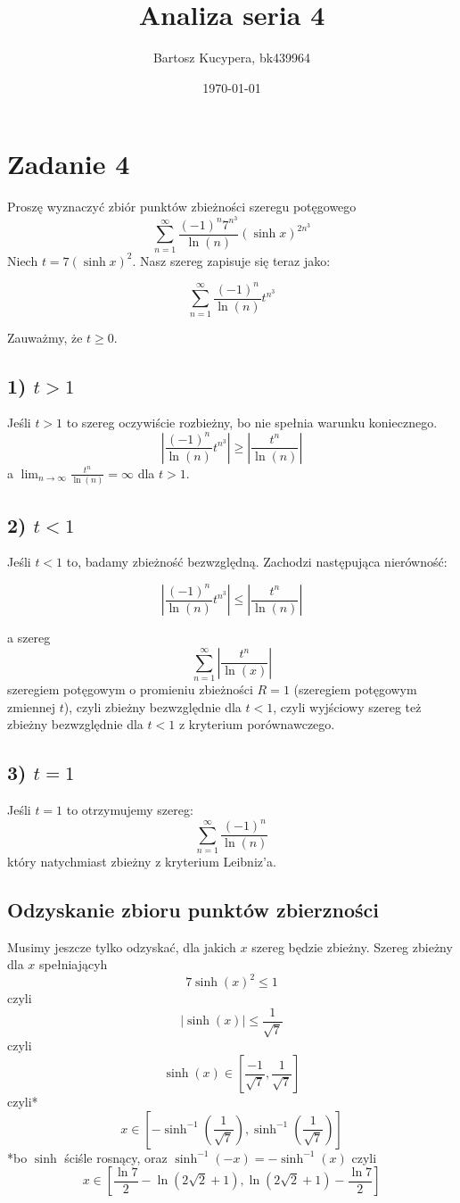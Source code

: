 \documentclass{article}
\title{Analiza seria 4}
\author{Bartosz Kucypera, bk439964}
\date{\today}
\begin{document}
\maketitle

\section*{Zadanie 4}
Proszę wyznaczyć zbiór punktów zbieżności szeregu potęgowego
$$\sum_{n=1}^{\infty} \frac{(-1)^n7^{n^3}}{\ln(n)}(\sinh x)^{2n^3}$$
Niech $t = 7(\sinh x)^2$. Nasz szereg zapisuje się teraz jako:

$$ \sum_{n=1}^{\infty}\frac{(-1)^n}{\ln(n)} t^{n^3}$$

Zauważmy, że $t \ge 0$.\newline 
\subsection*{1) $t > 1$}
Jeśli $t>1$ to szereg oczywiście rozbieżny, bo nie spełnia warunku koniecznego.
$$ \left| \frac{(-1)^n}{\ln(n)}t^{n^3} \right| \ge \left| \frac{t^n}{\ln(n)} \right| $$
a $\displaystyle \lim_{n \to \infty} \frac{t^n}{\ln(n)} = \infty$ dla $t>1$.

\subsection*{2) $t < 1$}
Jeśli $t < 1$ to, badamy zbieżność bezwzględną. Zachodzi następująca nierówność:

$$ \left| \frac{(-1)^n}{\ln(n)}t^{n^3} \right| \le \left| \frac{t^n}{\ln(n)} \right| $$

a szereg
$$\sum_{n=1}^{\infty} \left| \frac{t^n}{\ln(x)} \right| $$ szeregiem potęgowym o promieniu zbieżności $R = 1$ (szeregiem potęgowym zmiennej $t$), czyli zbieżny bezwzględnie dla $t<1$, czyli wyjściowy szereg też zbieżny bezwzględnie dla $t<1$ z kryterium porównawczego.

\subsection*{3) $t = 1$}
Jeśli $t =1$ to otrzymujemy szereg:
$$ \sum_{n=1}^{\infty} \frac{(-1)^n}{\ln(n)}$$
który natychmiast zbieżny z kryterium Leibniz'a.

\newpage

\subsection*{Odzyskanie zbioru punktów zbierzności}
Musimy jeszcze tylko odzyskać, dla jakich $x$ szereg będzie zbieżny. Szereg zbieżny dla $x$ spełniającyh
$$ 7\sinh(x)^2 \le 1$$
czyli 
$$|\sinh(x)| \le \frac{1}{\sqrt{7}}$$
czyli
$$\sinh(x) \in \left[ \frac{-1}{\sqrt{7}}, \frac{1}{\sqrt{7}} \right]$$
czyli*
$$ x \in \left[-\sinh^{-1}\left(\frac{1}{\sqrt{7}}\right), \sinh^{-1}\left(\frac{1}{\sqrt{7}}\right) \right] $$
*bo $\sinh$ ściśle rosnący, oraz $\sinh^{-1}(-x) = -\sinh^{-1}(x)$ \newline
czyli 
$$ x \in \left[\frac{\ln7}{2}-\ln(2\sqrt{2}+1), \ln(2\sqrt{2}+1)-\frac{\ln7}{2} \right]$$
\end{document}
